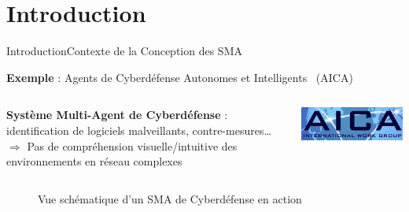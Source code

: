 

\addtocounter{framenumber}{-1}

\section{Introduction}
\begin{frame}{Introduction}{Contexte de la Conception des SMA}

    \begin{center}
        \begin{minipage}{0.95\linewidth}
            \centering
            \begin{exampleblock}{\textbf{Exemple} : Agents de Cyberdéfense Autonomes et Intelligents~\cite{Kott2023} (AICA)}

                \begin{columns}
                    \hspace{5ex}
                    \begin{column}{0.85\textwidth}
                        \textbf{Système Multi-Agent de Cyberdéfense} : identification de logiciels malveillants, contre-mesures\dots \\
                        $\Longrightarrow$ Pas de compréhension visuelle/intuitive des environnements en réseau complexes
                    \end{column}
                    \begin{column}{0.22\textwidth}
                        \hspace{-2.5ex}
                        \includegraphics[width=0.8\linewidth]{figures/AICA_IWG.jpg}
                    \end{column}
                \end{columns}

            \end{exampleblock}
        \end{minipage}
    \end{center}

    \begin{figure}
        \centering
        
        \caption{Vue schématique d'un SMA de Cyberdéfense en action}
        \label{fig:my_label}
    \end{figure}

\end{frame}

